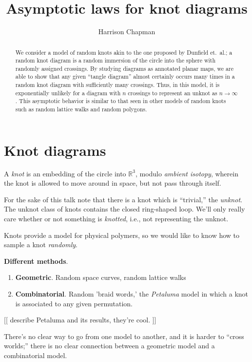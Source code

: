 \documentclass[12pt]{amsart}
\title{Asymptotic laws for knot diagrams}
\author{Harrison Chapman}
\newcommand{\R}{\mathbb{R}}
\theoremstyle{definition}
\theoremstyle{plain}
\begin{document}
\begin{abstract}
  We consider a model of random knots akin to the one proposed by
Dunfield et.\ al.; a random knot diagram is a random immersion of the
circle into the sphere with randomly assigned crossings. By studying
diagrams as annotated planar maps, we are able to show that any given ``tangle
diagram'' almost certainly occurs many times in a random knot diagram
with sufficiently many crossings. Thus, in this model, it is
exponentially unlikely for a diagram with $n$ crossings to represent
an unknot as $n \rightarrow \infty$. This asymptotic behavior is
similar to that seen in other models of random knots such as random
lattice walks and random polygons.
\end{abstract}
\maketitle

\doublespacing

\section{Knot diagrams}

A \emph{knot} is an embedding of the circle into $\R^3$, modulo
\emph{ambient isotopy}, wherein the knot is allowed to move around in
space, but not pass through itself.

For the sake of this talk note that there is a knot which is
``trivial,'' the \emph{unknot}. The unknot class of knots contains the
closed ring-shaped loop. We'll only really care whether or not something is
\emph{knotted}, i.e., not representing the unknot.

Knots provide a model for physical polymers, so we would like to know
how to sample a knot \emph{randomly}.

\textbf{Different methods}.
\begin{enumerate}
\item \textbf{Geometric}. Random space curves, random lattice walks
\item \textbf{Combinatorial}. Random 'braid words,' the
  \emph{Petaluma} model in which a knot is associated to any given permutation.
\end{enumerate}
 [[ describe Petaluma and its results, they're cool. ]]

\vspace{2in}

There's no clear way to go from one model to another, and it is harder
to ``cross worlds;'' there is no clear connection between a geometric
model and a combinatorial model.
\end{document}
